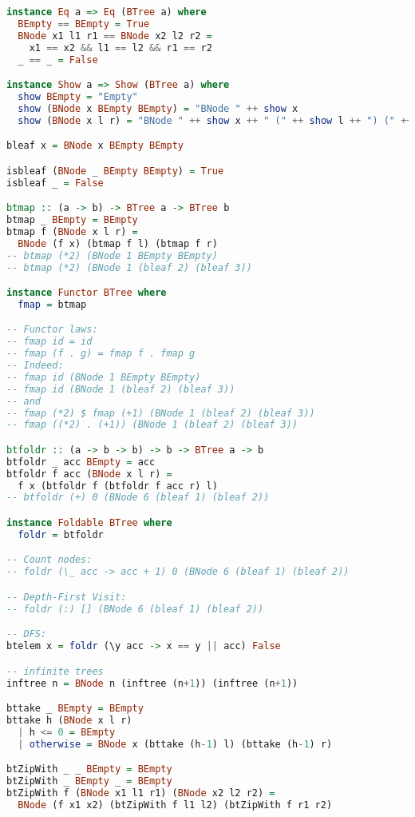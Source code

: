 \begin{lstlisting}[language=Haskell]
instance Eq a => Eq (BTree a) where
  BEmpty == BEmpty = True
  BNode x1 l1 r1 == BNode x2 l2 r2 =
    x1 == x2 && l1 == l2 && r1 == r2
  _ == _ = False

instance Show a => Show (BTree a) where
  show BEmpty = "Empty"
  show (BNode x BEmpty BEmpty) = "BNode " ++ show x
  show (BNode x l r) = "BNode " ++ show x ++ " (" ++ show l ++ ") (" ++ show r ++ ")"

bleaf x = BNode x BEmpty BEmpty

isbleaf (BNode _ BEmpty BEmpty) = True
isbleaf _ = False

btmap :: (a -> b) -> BTree a -> BTree b
btmap _ BEmpty = BEmpty
btmap f (BNode x l r) =
  BNode (f x) (btmap f l) (btmap f r)
-- btmap (*2) (BNode 1 BEmpty BEmpty)
-- btmap (*2) (BNode 1 (bleaf 2) (bleaf 3))

instance Functor BTree where
  fmap = btmap

-- Functor laws:
-- fmap id = id
-- fmap (f . g) = fmap f . fmap g
-- Indeed:
-- fmap id (BNode 1 BEmpty BEmpty)
-- fmap id (BNode 1 (bleaf 2) (bleaf 3))
-- and
-- fmap (*2) $ fmap (+1) (BNode 1 (bleaf 2) (bleaf 3))
-- fmap ((*2) . (+1)) (BNode 1 (bleaf 2) (bleaf 3))

btfoldr :: (a -> b -> b) -> b -> BTree a -> b
btfoldr _ acc BEmpty = acc
btfoldr f acc (BNode x l r) =
  f x (btfoldr f (btfoldr f acc r) l)
-- btfoldr (+) 0 (BNode 6 (bleaf 1) (bleaf 2))

instance Foldable BTree where
  foldr = btfoldr

-- Count nodes:
-- foldr (\_ acc -> acc + 1) 0 (BNode 6 (bleaf 1) (bleaf 2))

-- Depth-First Visit:
-- foldr (:) [] (BNode 6 (bleaf 1) (bleaf 2))

-- DFS:
btelem x = foldr (\y acc -> x == y || acc) False

-- infinite trees
inftree n = BNode n (inftree (n+1)) (inftree (n+1))

bttake _ BEmpty = BEmpty
bttake h (BNode x l r)
  | h <= 0 = BEmpty
  | otherwise = BNode x (bttake (h-1) l) (bttake (h-1) r)

btZipWith _ _ BEmpty = BEmpty
btZipWith _ BEmpty _ = BEmpty
btZipWith f (BNode x1 l1 r1) (BNode x2 l2 r2) =
  BNode (f x1 x2) (btZipWith f l1 l2) (btZipWith f r1 r2)
\end{lstlisting}